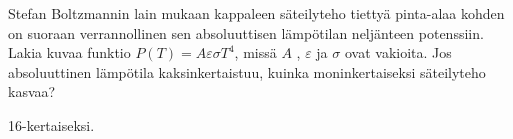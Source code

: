 \begin{tehtavasivu}
\begin{tehtava}
Stefan Boltzmannin lain mukaan kappaleen säteilyteho tiettyä pinta-alaa kohden on suoraan verrannollinen sen absoluuttisen lämpötilan neljänteen potenssiin. Lakia kuvaa funktio $ P(T)=A\varepsilon\sigma T^4 $, missä $ A$ , $\varepsilon$ ja $\sigma $ ovat vakioita.  Jos absoluuttinen lämpötila kaksinkertaistuu, kuinka moninkertaiseksi säteilyteho kasvaa?
\begin{vastaus}
16-kertaiseksi.
\end{vastaus}
\end{tehtava}

\end{tehtavasivu}
